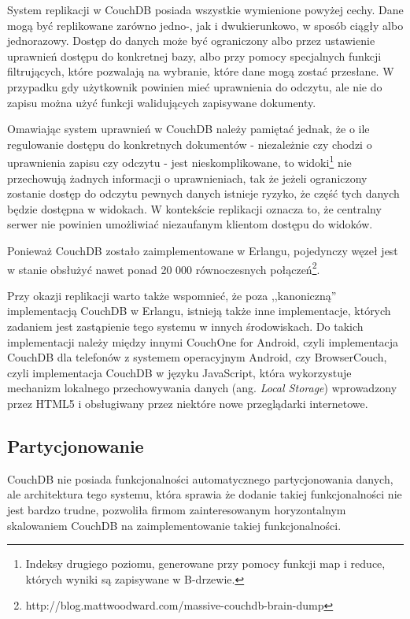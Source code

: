 System replikacji w CouchDB posiada wszystkie wymienione powyżej cechy.
Dane mogą być replikowane zarówno jedno-, jak i dwukierunkowo, w sposób ciągły albo jednorazowy.
Dostęp do danych może być ograniczony albo przez ustawienie uprawnień dostępu do konkretnej bazy, albo przy pomocy specjalnych funkcji filtrujących, które pozwalają na wybranie, które dane mogą zostać przesłane.
W przypadku gdy użytkownik powinien mieć uprawnienia do odczytu, ale nie do zapisu można użyć funkcji walidujących zapisywane dokumenty.

Omawiając system uprawnień w CouchDB należy pamiętać jednak, że o ile regulowanie dostępu do konkretnych dokumentów - niezależnie czy chodzi o uprawnienia zapisu czy odczytu - jest nieskomplikowane, to widoki\footnote{Indeksy drugiego poziomu, generowane przy pomocy funkcji map i reduce, których wyniki są zapisywane w B-drzewie.} nie przechowują żadnych informacji o uprawnieniach, tak że jeżeli ograniczony zostanie dostęp do odczytu pewnych danych istnieje ryzyko, że część tych danych będzie dostępna w widokach.
W kontekście replikacji oznacza to, że centralny serwer nie powinien umożliwiać niezaufanym klientom dostępu do widoków.

Ponieważ CouchDB zostało zaimplementowane w Erlangu, pojedynczy węzeł jest w stanie obsłużyć nawet ponad 20 000 równoczesnych połączeń\footnote{http://blog.mattwoodward.com/massive-couchdb-brain-dump}.

Przy okazji replikacji warto także wspomnieć, że poza ,,kanoniczną'' implementacją CouchDB w Erlangu, istnieją także inne implementacje, których zadaniem jest zastąpienie tego systemu w innych środowiskach.
Do takich implementacji należy między innymi CouchOne for Android, czyli implementacja CouchDB dla telefonów z systemem operacyjnym Android, czy BrowserCouch, czyli implementacja CouchDB w języku JavaScript, która wykorzystuje mechanizm lokalnego przechowywania danych (ang. \emph{Local Storage}) wprowadzony przez HTML5 i obsługiwany przez niektóre nowe przeglądarki internetowe.

\subsection*{Partycjonowanie}

CouchDB nie posiada funkcjonalności automatycznego partycjonowania danych, ale architektura tego systemu, która sprawia że dodanie takiej funkcjonalności nie jest bardzo trudne, pozwoliła firmom zainteresowanym horyzontalnym skalowaniem CouchDB na zaimplementowanie takiej funkcjonalności.

